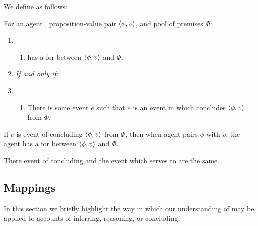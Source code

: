 \begin{note}
  We define \witness{} as follows:

  \begin{definition}[A \witness{2}]
    \label{def:witnessing}
    For an agent \vAgent{}, proposition-value pair \(\langle \phi, v \rangle\), and pool of premises \(\Phi\):

    \begin{enumerate}[label=]
    \item
      \begin{enumerate}[label=\alph*., ref=(\alph*), series=WitnessDef]
      \item
        \vAgent{} has a \emph{} for \ros{} between \(\langle \phi, v \rangle\) and \(\Phi\).
      \end{enumerate}
    \item
      \emph{If and only if:}
    \item
      \begin{enumerate}[label=\alph*., ref=(\alph*), resume*=WitnessDef]
      \item
        There is some event \(e\) such that \(e\) is an event in which \vAgent{} concludes \(\langle \phi, v \rangle\) from \(\Phi\).
      \end{enumerate}
    \end{enumerate}
    \vspace{-\baselineskip}
  \end{definition}

  If \(e\) is event of concluding \(\langle \phi, v \rangle\) from \(\Phi\), then when agent pairs \(\phi\) with \(v\), the agent has a \witness{} for \ros{} between \(\langle \phi, v \rangle\) and \(\Phi\).

  There event of concluding and the event which serves to \witness{} are the same.
\end{note}

\subsection{Mappings}

\begin{note}
  In this section we briefly highlight the way in which our understanding of \support{} may be applied to accounts of inferring, reasoning, or concluding.
\end{note}

\paragraph{\textcite{Boghossian:2014aa}}

